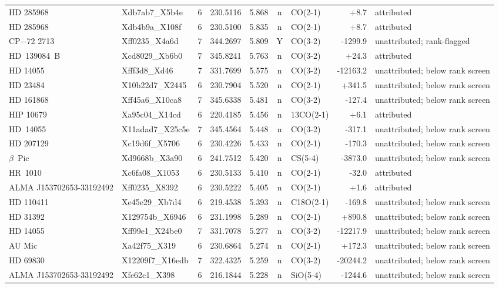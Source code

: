\begin{tabular}{@{}l@{~}l@{~}c@{~}r@{~}r@{~}c@{~}l@{~}r@{~}l@{}}
HD 285968 & Xdb7ab7\_X5b4e & 6 & 230.5116 & 5.868 & n & CO(2-1) & +8.7 & attributed \\
HD 285968 & Xdb4b9a\_X108f & 6 & 230.5100 & 5.835 & n & CO(2-1) & +8.7 & attributed \\
CP$-$72 2713 & Xff0235\_X4a6d & 7 & 344.2697 & 5.809 & Y & CO(3-2) & -1299.9 & unattributed; rank-flagged \\
HD~139084~B & Xcd8029\_Xb6b0 & 7 & 345.8241 & 5.763 & n & CO(3-2) & +24.3 & attributed \\
HD 14055 & Xfff3d8\_Xd46 & 7 & 331.7699 & 5.575 & n & CO(3-2) & -12163.2 & unattributed; below rank screen \\
HD 23484 & X10b22d7\_X2445 & 6 & 230.7904 & 5.520 & n & CO(2-1) & +341.5 & unattributed; below rank screen \\
HD 161868 & Xff45a6\_X10ca8 & 7 & 345.6338 & 5.481 & n & CO(3-2) & -127.4 & unattributed; below rank screen \\
HIP 10679 & Xa95c04\_X14cd & 6 & 220.4185 & 5.456 & n & 13CO(2-1) & +6.1 & attributed \\
HD~14055 & X11adad7\_X25c5e & 7 & 345.4564 & 5.448 & n & CO(3-2) & -317.1 & unattributed; below rank screen \\
HD 207129 & Xc19d6f\_X5706 & 6 & 230.4226 & 5.433 & n & CO(2-1) & -170.3 & unattributed; below rank screen \\
$\beta$~Pic & Xd9668b\_X3a90 & 6 & 241.7512 & 5.420 & n & CS(5-4) & -3873.0 & unattributed; below rank screen \\
HR~1010 & Xc6fa08\_X1053 & 6 & 230.5133 & 5.410 & n & CO(2-1) & -32.0 & attributed \\
ALMA J153702653-33192492 & Xff0235\_X8392 & 6 & 230.5222 & 5.405 & n & CO(2-1) & +1.6 & attributed \\
HD 110411 & Xe45e29\_Xb7d4 & 6 & 219.4538 & 5.393 & n & C18O(2-1) & -169.8 & unattributed; below rank screen \\
HD 31392 & X129754b\_X6946 & 6 & 231.1998 & 5.289 & n & CO(2-1) & +890.8 & unattributed; below rank screen \\
HD 14055 & Xff99e1\_X24be0 & 7 & 331.7078 & 5.277 & n & CO(3-2) & -12217.9 & unattributed; below rank screen \\
AU Mic & Xa42f75\_X319 & 6 & 230.6864 & 5.274 & n & CO(2-1) & +172.3 & unattributed; below rank screen \\
HD 69830 & X12209f7\_X16edb & 7 & 322.4325 & 5.259 & n & CO(3-2) & -20244.2 & unattributed; below rank screen \\
ALMA J153702653-33192492 & Xfe62c1\_X398 & 6 & 216.1844 & 5.228 & n & SiO(5-4) & -1244.6 & unattributed; below rank screen \\

\end{tabular}
